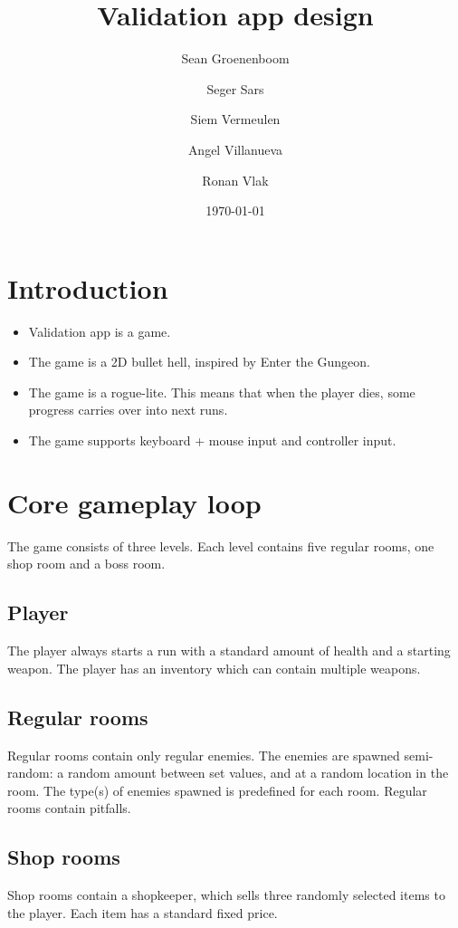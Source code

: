 \documentclass{article}
\title{Validation app design}
\author{Sean Groenenboom \and Seger Sars \and Siem Vermeulen \and Angel Villanueva \and Ronan Vlak} %
\date{\today} %
\begin{document}
\maketitle %
\newpage

\tableofcontents
\newpage

\section{Introduction}
\begin{itemize}
    \item Validation app is a game.
    \item The game is a 2D bullet hell, inspired by Enter the Gungeon.
    \item The game is a rogue-lite. This means that when the player dies, some progress carries over into next runs.
    \item The game supports keyboard + mouse input and controller input.
\end{itemize}

\section{Core gameplay loop}
The game consists of three levels.
Each level contains five regular rooms, one shop room and a boss room.

\subsection{Player}
The player always starts a run with a standard amount of health and a starting weapon.
The player has an inventory which can contain multiple weapons.

\subsection{Regular rooms}
Regular rooms contain only regular enemies.
The enemies are spawned semi-random: a random amount between set values, and at a random location in the room.
The type(s) of enemies spawned is predefined for each room.
Regular rooms contain pitfalls.

\subsection{Shop rooms}
Shop rooms contain a shopkeeper, which sells three randomly selected items to the player.
Each item has a standard fixed price.
\end{document}
